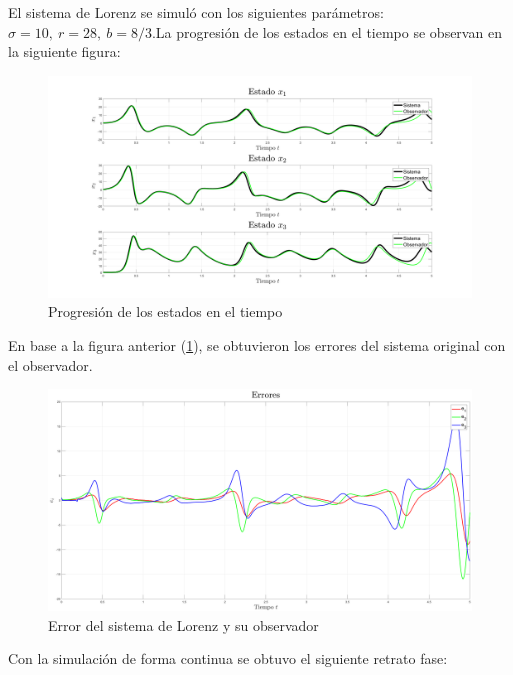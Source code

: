El sistema de Lorenz se simuló con los siguientes parámetros: $\sigma = 10, \ r = 28, \ b = 8/3$.La progresión de los estados en el tiempo se observan en la siguiente figura:

\begin{figure}[H]
	\centering
	\includegraphics[width=150mm]{img/E1_Estados_Disc.png}
	\caption{Progresión de los estados en el tiempo}
	\label{img:lorenzD2}
\end{figure}

En base a la figura anterior (\ref{img:lorenzD2}), se obtuvieron los errores del sistema original con el observador.

\begin{figure}[H]
	\centering
	\includegraphics[width=150mm]{img/E1_Errores_Disc.png}
	\caption{Error del sistema de Lorenz y su observador}
	\label{img:lorenzD3}
\end{figure}

Con la simulación de forma continua se obtuvo el siguiente retrato fase:

